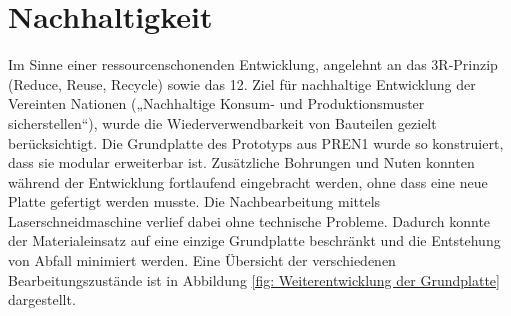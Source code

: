 \section{Nachhaltigkeit}

Im Sinne einer ressourcenschonenden Entwicklung, angelehnt an das 3R-Prinzip (Reduce, Reuse, Recycle) sowie das 12. Ziel für nachhaltige Entwicklung der Vereinten Nationen („Nachhaltige Konsum- und Produktionsmuster sicherstellen“), wurde die Wiederverwendbarkeit von Bauteilen gezielt berücksichtigt. Die Grundplatte des Prototyps aus PREN1 wurde so konstruiert, dass sie modular erweiterbar ist. Zusätzliche Bohrungen und Nuten konnten während der Entwicklung fortlaufend eingebracht werden, ohne dass eine neue Platte gefertigt werden musste. Die Nachbearbeitung mittels Laserschneidmaschine verlief dabei ohne technische Probleme. Dadurch konnte der Materialeinsatz auf eine einzige Grundplatte beschränkt und die Entstehung von Abfall minimiert werden. Eine Übersicht der verschiedenen Bearbeitungszustände ist in Abbildung \ref{fig: Weiterentwicklung der Grundplatte} dargestellt.


